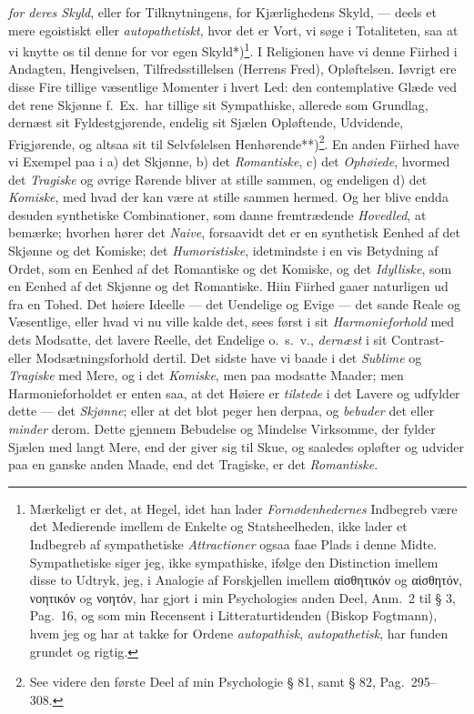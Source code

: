 \documentclass[12pt,a4paper]{book}
\newcommand{\apage}[1]{\marginnote{\footnotesize\textit{[#1]}}}
\begin{document}
\emph{for deres Skyld}, eller for Tilknytningens, for Kjærlighedens Skyld, --- deels et
mere egoistiskt eller \emph{autopathetiskt}, hvor det er Vort, vi søge i Totaliteten,
saa at vi knytte os til denne for vor egen Skyld*)\footnote{Mærkeligt er det, at
Hegel, idet han lader \emph{Fornødenhedernes} Indbegreb være det Medierende imellem de
Enkelte og Statsheelheden, ikke lader et Indbegreb af sympathetiske \emph{Attractioner}
ogsaa faae Plads i denne Midte. Sympathetiske siger jeg, ikke sympathiske,
ifølge den Distinction imellem disse to Udtryk, jeg, i Analogie af Forskjellen
imellem αἰσθητικόν og αἰσθητόν, νοητικόν og νοητόν, har gjort i min Psychologies
anden Deel, Anm.\ 2 til § 3, Pag.\ 16, og som min Recensent i Litteraturtidenden
(Biskop Fogtmann), hvem jeg og har at takke for Ordene \emph{autopathisk},
\emph{autopathetisk}, har funden grundet og rigtig.}. I Religionen have vi denne
Fiirhed i Andagten, Hengivelsen, Tilfredsstillelsen (Herrens Fred),
Opløftelsen. Iøvrigt ere disse Fire tillige væsentlige Momenter i hvert Led: den
contemplative Glæde ved det rene Skjønne f.\ Ex.\ har tillige sit
Sympathiske, allerede som Grundlag, dernæst sit Fyldestgjørende, endelig sit
Sjælen Opløftende, Udvidende, Frigjørende, og altsaa sit til Selvfølelsen
Henhørende**)\footnote{See videre den første Deel af min Psychologie § 81, samt
§ 82, Pag.\ 295--308.}. En anden Fiirhed have vi Exempel paa i a) det Skjønne,
b) det \emph{Romantiske}, c) det \emph{Ophøiede}, hvormed det \emph{Tragiske} og øvrige Rørende
bliver at stille sammen, og endeligen d) det \emph{Komiske}, med hvad der kan være at
stille \apage{135} sammen hermed. Og her blive endda desuden synthetiske Combinationer, som
danne fremtrædende \emph{Hovedled}, at bemærke; hvorhen hører det \emph{Naive}, forsaavidt det
er en synthetisk Eenhed af det Skjønne og det Komiske; det \emph{Humoristiske},
idetmindste i en vis Betydning af Ordet, som en Eenhed af det Romantiske og det
Komiske, og det \emph{Idylliske}, som en Eenhed af det Skjønne og det Romantiske. Hiin
Fiirhed gaaer naturligen ud fra en Tohed. Det høiere Ideelle --- det Uendelige
og Evige --- det sande Reale og Væsentlige, eller hvad vi nu ville kalde det,
sees først i sit \emph{Harmonieforhold} med dets Modsatte, det lavere Reelle, det
Endelige o.\ s.\ v., \emph{dernæst} i sit Contrast- eller Modsætningsforhold dertil. Det
sidste have vi baade i det \emph{Sublime} og \emph{Tragiske} med Mere, og i det \emph{Komiske}, men
paa modsatte Maader; men Harmonieforholdet er enten saa, at det Høiere er
\emph{tilstede} i det Lavere og udfylder dette --- det \emph{Skjønne}; eller at det blot peger
hen derpaa, og \emph{bebuder} det eller \emph{minder} derom. Dette gjennem Bebudelse og
Mindelse Virksomme, der fylder Sjælen med langt Mere, end der giver sig til Skue,
og saaledes opløfter og udvider paa en ganske anden Maade, end det Tragiske, er
det \emph{Romantiske}.
\end{document}

